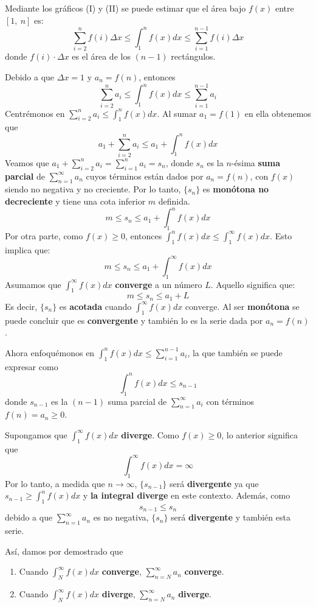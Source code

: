 \documentclass[12pt]{article}
\begin{document}
Mediante los gráficos (I) y (II) se puede estimar que el área bajo $f(x)$ entre $[1, \ n]$ es:
\[
  \sum_{i = 2}^{n} f(i) \Delta x \leq \int_{1}^{n} f(x)dx \leq \sum_{i = 1}^{n - 1} f(i) \Delta x
\]
donde $f(i) \cdot \Delta x$ es el área de los $(n - 1)$ rectángulos.

Debido a que $\Delta x = 1$ y $a_{n} = f(n)$, entonces
\[
  \sum_{i = 2}^{n} a_{i} \leq \int_{1}^{n} f(x)dx \leq \sum_{i = 1}^{n - 1} a_{i}
\]
Centrémonos en $\sum_{i = 2}^{n} a_{i} \leq \int_{1}^{n} f(x)dx$. Al sumar $a_{1} = f(1)$ en ella obtenemos que
\[
  a_{1} + \sum_{i = 2}^{n} a_{i} \leq a_{1} + \int_{1}^{n} f(x)dx
\]
Veamos que $a_{1} + \sum_{i = 2}^{n} a_{i} = \sum_{i = 1}^{n} a_{i} = s_{n}$, donde $s_{n}$ es la $n$-ésima \textbf{suma parcial} de $\sum_{n = 1}^{\infty} a_{n}$ cuyos términos están dados por $a_{n} = f(n)$, con $f(x)$ siendo no negativa y no creciente. Por lo tanto, $\{s_{n}\}$ es \textbf{monótona no decreciente} y tiene una cota inferior $m$ definida.
\[
  m \leq s_{n} \leq a_{1} + \int_{1}^{n} f(x)dx
\]
Por otra parte, como $f(x) \geq 0$, entonces $\int_{1}^{n} f(x)dx \leq \int_{1}^{\infty} f(x)dx$. Esto implica que:
\[
   m \leq s_{n} \leq a_{1} + \int_{1}^{\infty} f(x)dx
\]
Asumamos que $\int_{1}^{\infty} f(x)dx$ \textbf{converge} a un número $L$. Aquello significa que:
\[
  m \leq s_{n} \leq a_{1} + L
\]
Es decir, $\{s_{n}\}$ es \textbf{acotada} cuando $\int_{1}^{\infty} f(x)dx$ converge. Al ser \textbf{monótona} se puede concluir que es \textbf{convergente} y también lo es la serie dada por $a_{n} = f(n)$.

Ahora enfoquémonos en $\int_{1}^{n} f(x)dx \leq \sum_{i = 1}^{n - 1} a_{i}$, la que también se puede expresar como
\[
  \int_{1}^{n} f(x)dx \leq s_{n - 1}
\]
donde $s_{n - 1}$ es la $(n - 1)$ suma parcial de $\sum_{n = 1}^{\infty} a_{i}$ con términos $f(n) = a_{n} \geq 0$.

Supongamos que $\int_{1}^{\infty} f(x)dx$ \textbf{diverge}. Como $f(x) \geq 0$, lo anterior significa que
\[
  \int_{1}^{\infty} f(x)dx = \infty
\]
Por lo tanto, a medida que $n \to \infty$, $\{s_{n - 1}\}$ será \textbf{divergente} ya que $s_{n - 1} \geq \int_{1}^{n} f(x)dx$ y \textbf{la integral diverge} en este contexto. Además, como
\[
  s_{n - 1} \leq s_{n}
\]
debido a que $\sum_{n = 1}^{\infty} a_{n}$ es no negativa, $\{s_{n}\}$ será \textbf{divergente} y también esta serie.

Así, damos por demostrado que

\begin{enumerate}
\item Cuando $\int_{N}^{\infty}f(x)dx$ \textbf{converge}, $\sum_{n = N}^{\infty} a_{n}$ \textbf{converge}.
\item Cuando $\int_{N}^{\infty}f(x)dx$ \textbf{diverge}, $\sum_{n = N}^{\infty} a_{n}$ \textbf{diverge}.
\end{enumerate}
\end{document}
